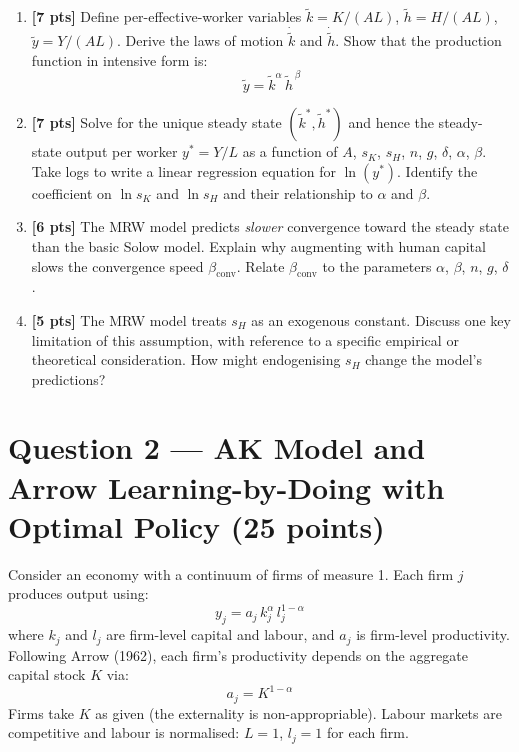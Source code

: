 \documentclass[a4paper,11pt]{article}
\newcommand{\ktilde}{\tilde{k}}
\newcommand{\ytilde}{\tilde{y}}
\begin{document}
\bigskip
\begin{enumerate}[label=\textbf{(\arabic*)},leftmargin=*]

\item \textbf{[7 pts]}
Define per-effective-worker variables $\ktilde = K/(AL)$, $\tilde{h} = H/(AL)$, $\ytilde = Y/(AL)$. Derive the laws of motion $\dot{\ktilde}$ and $\dot{\tilde{h}}$. Show that the production function in intensive form is:
\[
  \ytilde = \ktilde^{\alpha}\,\tilde{h}^{\,\beta}
\]

\item \textbf{[7 pts]}
Solve for the unique steady state $(\ktilde^{\!*}, \tilde{h}^*)$ and hence the steady-state output per worker $y^* = Y/L$ as a function of $A$, $s_K$, $s_H$, $n$, $g$, $\delta$, $\alpha$, $\beta$. Take logs to write a linear regression equation for $\ln(y^*)$. Identify the coefficient on $\ln s_K$ and $\ln s_H$ and their relationship to $\alpha$ and $\beta$.

\item \textbf{[6 pts]}
The MRW model predicts \emph{slower} convergence toward the steady state than the basic Solow model. Explain why augmenting with human capital slows the convergence speed $\beta_{\mathrm{conv}}$. Relate $\beta_{\mathrm{conv}}$ to the parameters $\alpha$, $\beta$, $n$, $g$, $\delta$.

\item \textbf{[5 pts]}
The MRW model treats $s_H$ as an exogenous constant. Discuss one key limitation of this assumption, with reference to a specific empirical or theoretical consideration. How might endogenising $s_H$ change the model's predictions?

\end{enumerate}

\clearpage

\section*{Question 2 --- AK Model and Arrow Learning-by-Doing with Optimal Policy \hfill (25 points)}

Consider an economy with a continuum of firms of measure 1. Each firm $j$ produces output using:
\[
  y_j = a_j\, k_j^{\alpha}\, l_j^{1-\alpha}
\]
where $k_j$ and $l_j$ are firm-level capital and labour, and $a_j$ is firm-level productivity. Following Arrow (1962), each firm's productivity depends on the aggregate capital stock $K$ via:
\[
  a_j = K^{1-\alpha}
\]
Firms take $K$ as given (the externality is non-appropriable). Labour markets are competitive and labour is normalised: $L = 1$, $l_j = 1$ for each firm.
\end{document}
